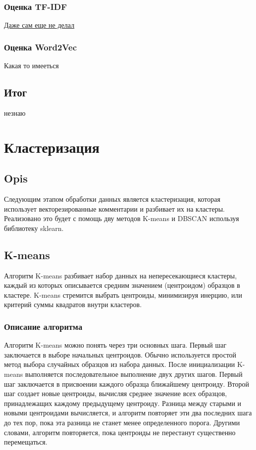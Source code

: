 		\subsubsection{Оценка TF-IDF}
			\underline{Даже сам еще не делал}
		
		\subsubsection{Оценка Word2Vec}
			Какая то имееться
		
 	
 	\subsection{Итог}
		незнаю
	
\section{Кластеризация}

	\subsection{Opis}
		Следующим этапом обработки данных является кластеризация, которая использует векторезированные комментарии и разбивает их на кластеры. Реализовано это будет с помощь дву методов K-means и DBSCAN используя библиотеку sklearn.
	
	\subsection{K-means}
 		Алгоритм K-means  разбивает набор данных на непересекающиеся кластеры, каждый из которых описывается средним значением (центроидом) образцов в кластере. K-means стремится выбрать центроиды, минимизируя инерцию, или критерий суммы квадратов внутри кластеров.
	
		\subsubsection{Описание алгоритма}
			Алгоритм K-means можно понять через три основных шага. Первый шаг заключается в выборе начальных центроидов. Обычно используется простой метод выбора случайных образцов из набора данных. После инициализации K-means выполняется последовательное выполнение двух других шагов. Первый шаг заключается в присвоении каждого образца ближайшему центроиду. Второй шаг создает новые центроиды, вычисляя среднее значение всех образцов, принадлежащих каждому предыдущему центроиду. Разница между старыми и новыми центроидами вычисляется, и алгоритм повторяет эти два последних шага до тех пор, пока эта разница не станет менее определенного порога. Другими словами, алгоритм повторяется, пока центроиды не перестанут существенно перемещаться.

